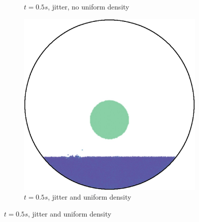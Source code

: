\begin{figure}[hbt]
\begin{subfigure}[t]{0.3\textwidth}
    \caption{$t=0.5s$, jitter, no uniform density}
  \end{subfigure}
  \begin{subfigure}[t]{0.3\textwidth}
    \centering
    \includegraphics*[width=\textwidth]{images/density/0.5shex2.5jequi.jpg}
    \caption{$t=0.5s$, jitter and uniform density}
    \label{fig:jitter-and-uniform-density-jdt0.5}
  \end{subfigure}


\end{figure}
